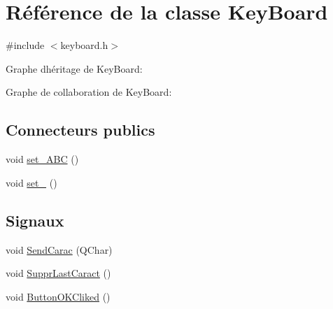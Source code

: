 \hypertarget{class_key_board}{}\section{Référence de la classe Key\+Board}
\label{class_key_board}


{\ttfamily \#include $<$keyboard.\+h$>$}



Graphe d\textquotesingle{}héritage de Key\+Board\+:


Graphe de collaboration de Key\+Board\+:
\subsection*{Connecteurs publics}
\begin{DoxyCompactItemize}
\item 
void \hyperlink{class_key_board_a0a88d99ce0275cd047022890449ae942}{set\+\_\+\+A\+B\+C} ()
\item 
void \hyperlink{class_key_board_a7418c0e7e35b7eb83fbc3f3f3610a71e}{set\+\_} ()
\end{DoxyCompactItemize}
\subsection*{Signaux}
\begin{DoxyCompactItemize}
\item 
void \hyperlink{class_key_board_a924727fe4e66dfcd80397e4690ae3b58}{Send\+Carac} (Q\+Char)
\item 
void \hyperlink{class_key_board_ad3eb20343aaa5804e9b2c252acd15187}{Suppr\+Last\+Caract} ()
\item 
void \hyperlink{class_key_board_a2d383df55cd0c527dea90f57fd311402}{Button\+O\+K\+Cliked} ()
\end{DoxyCompactItemize}
